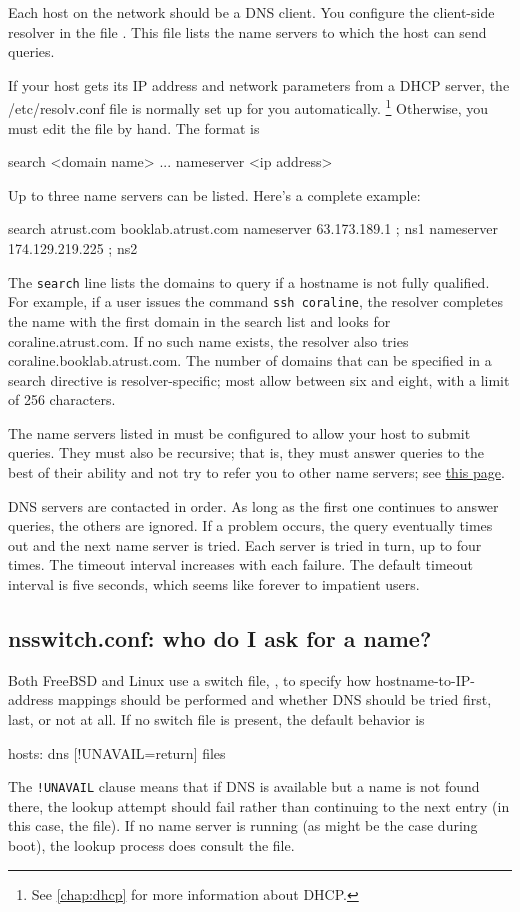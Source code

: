 Each host on the network should be a DNS client.
You configure the client-side resolver in the file .
This file lists the name servers to which the host can send queries.

If your host gets its IP address and network parameters from a DHCP server, the {/etc/resolv.conf} file is normally set up for you automatically.%
   \footnote{See \cref{chap:dhcp} for more information about DHCP.}
Otherwise, you must edit the file by hand.
The format is
\begin{config}
search <domain name> ...
nameserver <ip address>
\end{config}
Up to three name servers can be listed. Here's a complete example:
\begin{config}
search atrust.com booklab.atrust.com
nameserver 63.173.189.1      ; ns1
nameserver 174.129.219.225   ; ns2
\end{config}

The \texttt{search} line lists the domains to query if a hostname is not fully
qualified. For example, if a user issues the command \texttt{ssh coraline},
the resolver completes the name with the first domain in the search list
and looks for coraline.atrust.com. If no such name exists, the resolver
also tries coraline.booklab.atrust.com. The number of domains that can
be specified in a {search} directive is resolver-specific; most allow
between six and eight, with a limit of 256 characters.

The name servers listed in  must be configured to allow
your host to submit queries. They must also be recursive; that is, they
must answer queries to the best of their ability and not try to refer
you to other name servers; see
\protect\hyperlink{part0024_split_013.htmlux5cux23_idTextAnchor857}{this
page}.

DNS servers are contacted in order. As long as the first one continues
to answer queries, the others are ignored. If a problem occurs, the
query eventually times out and the next name server is tried. Each
server is tried in turn, up to four times. The timeout interval
increases with each failure. The default timeout interval is five
seconds, which seems like forever to impatient users.


\subsection{nsswitch.conf: who do I ask for a name?}

Both FreeBSD and Linux use a switch file, , to specify how hostname-to-IP-address mappings should be performed and
whether DNS should be tried first, last, or not at all.
If no switch file is present, the default behavior is
\begin{config}
hosts: dns [!UNAVAIL=return] files
\end{config}
The \texttt{!UNAVAIL} clause means that if DNS is available but a name is not found there, the lookup attempt should fail rather than continuing to
the next entry (in this case, the  file).
If no name server is running (as might be the case during boot), the lookup process does consult the  file.

